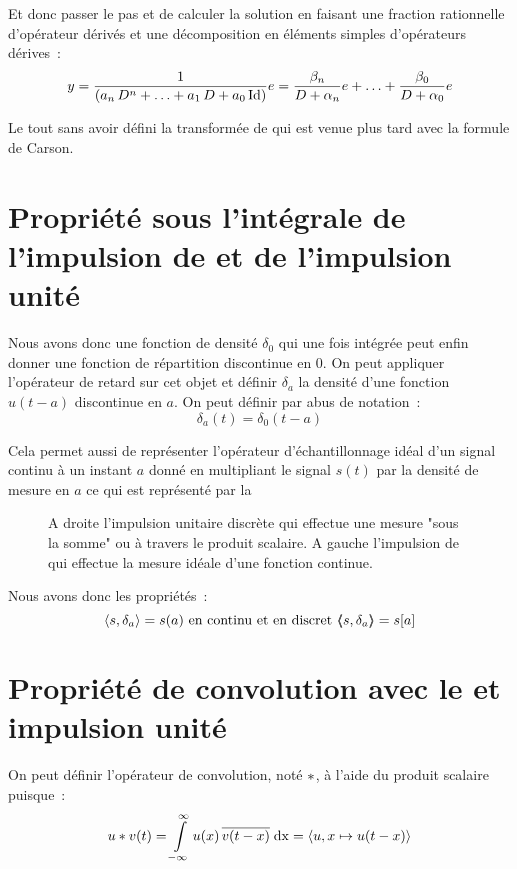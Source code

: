 Et donc passer le pas et de calculer la solution en faisant une
fraction rationnelle d'opérateur dérivés et une décomposition en
éléments simples d'opérateurs dérives~:
$$
y = \frac{1}{\left(a_n\,D^n + \ldots +a_1\, D  + a_0 \,\mathrm{Id}\right)} e = \frac{\beta_n}{D + \alpha_n} e + \ldots + \frac{\beta_0}{D + \alpha_0} e
$$

Le tout sans avoir défini la transformée de \Laplace{} qui est venue
plus tard avec la formule de Carson.


\section{Propriété sous l'intégrale de l'impulsion de \Dirac{} et de l'impulsion unité}
\label{sec:dirac_sous_integrale}
Nous avons donc une fonction de densité $\delta_0$ qui une fois
intégrée peut enfin donner une fonction de répartition discontinue en
$0$. On peut appliquer l'opérateur de retard sur cet objet et définir
$\delta_a$ la densité d'une fonction $u(t-a)$ discontinue en $a$. On peut définir par abus de notation~:
$$
\delta_a(t)= \delta_0(t-a)
$$

Cela permet aussi de représenter l'opérateur d'échantillonnage idéal d'un signal continu à un instant $a$ donné en multipliant le signal $s(t)$ par la densité de mesure en $a$ ce qui est représenté par la~
\begin{figure}[ht!]
  \centering
  \caption{A droite l'impulsion unitaire discrète qui effectue une mesure "sous la somme" ou à travers le produit scalaire. A gauche l'impulsion de \Dirac{} qui effectue la mesure idéale d'une fonction continue.}
  \label{fig:delta_mesure}
\end{figure}

Nous avons donc les propriétés~:
$$
\langle s,\delta_a\rangle=s(a) \text{ en continu et en discret } \langle\!\!\langle s,\delta_a\rangle\!\!\rangle=s[a] 
$$

\section{Propriété de convolution avec le \Dirac{} et impulsion unité}

On peut définir l'opérateur de convolution, noté $\ast$, à l'aide du produit scalaire puisque~:
\begin{equation}
  \label{eq:convolution}
  u\ast v(t) = \int\limits_{-\infty}^{\infty}{u(x)\,\overline{v(t-x)}\;\mathrm{d{x}}} = \langle u,x\mapsto u(t-x)\rangle
\end{equation}

